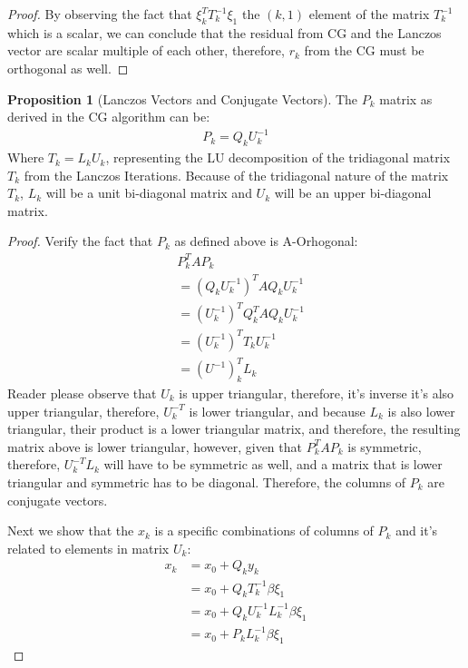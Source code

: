 \documentclass[]{article}
\theoremstyle{definition}
\newtheorem{prop}{Proposition}[section]  %
\begin{document}
\begin{proof}
                By observing the fact that $\xi^T_kT^{-1}_k\xi_1$ the $(k, 1)$ element of the matrix $T_k^{-1}$ which is a scalar, we can conclude that the residual from CG and the Lanczos vector are scalar multiple of each other, therefore, $r_k$ from the CG must be orthogonal as well. 
            \end{proof}
            \begin{prop}[Lanczos Vectors and Conjugate Vectors]
                The $P_k$ matrix as derived in the CG algorithm can be: 
                \begin{align}
                    P_k = Q_k U_k^{-1}
                \end{align}
                Where $T_k = L_kU_k$, representing the LU decomposition of the tridiagonal matrix $T_k$ from the Lanczos Iterations. Because of the tridiagonal nature of the matrix $T_k$, $L_k$ will be a unit bi-diagonal matrix and $U_k$ will be an upper bi-diagonal matrix. 
            \end{prop}
            \begin{proof}
                Verify the fact that $P_k$ as defined above is A-Orhogonal: 
                \begin{align}
                    & P_k^TAP_k
                    \\
                    &= (Q_k U_k^{-1})^T AQ_kU_k^{-1}
                    \\
                    &= (U_k^{-1})^{T}Q_k^{T}AQ_k U_k^{-1}
                    \\
                    &= (U_k^{-1})^{T}T_kU_k^{-1}
                    \\
                    &= (U^{-1})^T_kL_k
                \end{align}
                Reader please observe that $U_k$ is upper triangular, therefore, it's inverse it's also upper triangular, therefore, $U_k^{-T}$ is lower triangular, and because $L_k$ is also lower triangular, their product is a lower triangular matrix, and therefore, the resulting matrix above is lower triangular, however, given that $P_k^TAP_k$ is symmetric, therefore, $U_k^{-T}L_k$ will have to be symmetric as well, and a matrix that is lower triangular and symmetric has to be diagonal. Therefore, the columns of $P_k$ are conjugate vectors. 
                \par
                Next we show that the $x_k$ is a specific combinations of columns of $P_k$ and it's related to elements in matrix $U_k$: 
                \begin{align}
                    x_k &= x_0 + Q_k y_k 
                    \\
                    &= x_0 + Q_k T_{k}^{-1} \beta \xi_1
                    \\
                    &= x_0 + Q_k U_k^{-1}L_k^{-1}\beta \xi_1
                    \\
                    &= x_0 + P_k L_k^{-1}\beta\xi_1
                \end{align}
            \end{proof}
\end{document}
